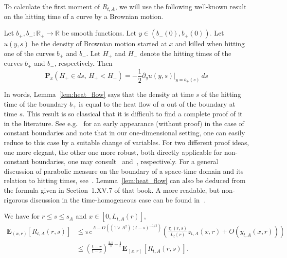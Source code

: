 \documentclass[AHL,Unicode,longabstracts,published]{cedram}
\newcommand*\E{\mathbf{E}}
\renewcommand*\P{\mathbf{P}}
\newcommand*\R{\mathbb{R}}
\newcommand{\1} {\mathds{1}}
\renewcommand*\to{\rightarrow}
\begin{document}
To calculate the first moment of $R_{t,A}$, we will use the following well-known result on the hitting time of a curve by a Brownian motion.

\begin{lemm}\label{lem:heat_flow}
Let $b_+,b_-:\R_+\to\R$ be smooth functions. Let $y \in (b_-(0),b_+(0))$. Let $u(y,s)$ be the density of Brownian motion started at $x$ and killed when hitting one of the curves $b_+$ and $b_-$. Let $H_+$ and $H_-$ denote the hitting times of the curves $b_+$ and $b_-$, respectively. Then
\[
\P_x\left(H_+ \in ds,\ H_+ < H_-\right) = - \frac 1 2 \partial_y u(y,s)\Big|_{y = b_+(s)}\, ds
\]
\end{lemm}

In words, Lemma~\ref{lem:heat_flow} says that the density at time $s$ of the hitting time of the boundary $b_+$ is equal to the heat flow of $u$ out of the boundary at time $s$. This result is so classical that it is difficult to find a complete proof of it in the literature. See e.g.~\cite[p.~154, eq.~32]{ito_mckean} for an early appearance (without proof) in the case of constant boundaries and note that in our one-dimensional setting, one can easily reduce to this case by a suitable change of variables. For two different proof ideas, one more elegant, the other one more robust, both directly applicable for non-constant boundaries, one may consult~\cite[Lemma~I.1.4]{lerche} and~\cite[Section~3]{daniels}, respectively. For a general discussion of parabolic measure on the boundary of a space-time domain and its relation to hitting times, see~\cite[Section~2.IX.13]{doob}. Lemma~\ref{lem:heat_flow} can also be deduced from the formula given in Section~1.XV.7 of that book. A more readable, but non-rigorous discussion in the time-homogeneous case can be found in~\cite[Section~5.2.1]{gardiner}.

\begin{lemm}\label{lem:Rexp}
We have for $r\le s\le s_A$ and $x\in [0,L_{t,A}(r)]$,
\begin{equation}\label{Rexp1}
\begin{split}
\E_{(x,r)}\left[R_{t,A}(r,s)\right] &\leq \pi e^{A + O\left(\left(1 \vee A^2\right)(t - s)^{-1/3}\right)} \left(\frac{\tau_0(r,s)}{L_t(r)} z_{t,A}(x,r) + O\left(y_{t,A}(x,r)\right)\right)\\
&\leq \left(\frac{t-r}{t-s}\right)^{\frac{2A} 3 + \frac 1 6}\E_{(x,r)}\left[R_{t,A}(r,s)\right].
\end{split}
\end{equation}
\end{lemm}
\end{document}
